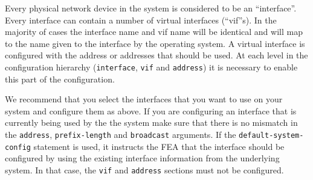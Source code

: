 Every physical network device in the system is considered to be an
``interface''. Every interface can contain a number of virtual
interfaces (``vif''s). In the majority of cases the interface name and
vif name will be identical and will map to the name given to the
interface by the operating system. A virtual interface is configured
with the address or addresses that should be used. At each level in
the configuration hierarchy ({\tt interface}, {\tt vif} and
{\tt address}) it is necessary to enable this part of the
configuration.

\vspace{0.1in}
\noindent{}
\vspace{0.1in}

We recommend that you select the interfaces that you want to use on
your system and configure them as above. If you are configuring an
interface that is currently being used by the the system make sure
that there is no mismatch in the {\tt address}, {\tt prefix-length} and
{\tt broadcast} arguments.
If the \linebreak
{\tt default-system-config} statement is used, it
instructs the FEA that the interface should be configured by using
the existing interface information from the underlying system.
In that case, the {\tt vif} and {\tt address} sections must not be
configured.

